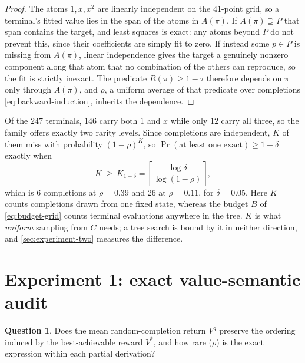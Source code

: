 \documentclass[11pt, a4paper]{article}
\theoremstyle{definition}
\newtheorem{question}[thm]{Question}
\newcommand{\noi}{\noindent}
\begin{document}
\begin{proof}
The atoms \(1,x,x^2\) are linearly independent on the \(41\)-point grid, so a
terminal's fitted value lies in the span of the atoms in \(A(\pi)\).  If
\(A(\pi)\supseteq P\) that span contains the target, and least squares is
exact: any atoms beyond \(P\) do not prevent this, since their coefficients
are simply fit to zero.  If instead some \(p\in P\) is missing from
\(A(\pi)\), linear independence gives the target a genuinely nonzero
component along that atom that no combination of the others can reproduce,
so the fit is strictly inexact.  The predicate \(R(\pi)\ge1-\tau\) therefore
depends on \(\pi\) only through \(A(\pi)\), and \(\rho\), a uniform average
of that predicate over completions \eqref{eq:backward-induction}, inherits
the dependence.
\end{proof}

\noi Of the \(247\) terminals, \(146\) carry both \(1\) and \(x\) while only
\(12\) carry all three, so the family offers exactly two rarity levels.
Since completions are
independent, \(K\) of them miss with
probability \((1-\rho)^K\), so \(\Pr(\text{at least one exact})\ge1-\delta\)
exactly when
\begin{equation}
    K\ \ge\ K_{1-\delta}
    =
    \left\lceil\frac{\log\delta}{\log(1-\rho)}\right\rceil,
    \label{eq:hit-budget}
\end{equation}
which is \(6\) completions at \(\rho=0.39\) and \(26\) at \(\rho=0.11\),
for \(\delta=0.05\).  Here \(K\) counts completions drawn from one fixed state,
whereas the budget \(B\) of \eqref{eq:budget-grid} counts terminal evaluations
anywhere in the tree.  \(K\) is what \emph{uniform} sampling from \(C\)
needs; a tree search is bound by it in neither direction, and
\cref{sec:experiment-two} measures the difference.

\section{Experiment 1: exact value-semantic audit}
\label{sec:experiment-one}

\begin{question}
Does the mean random-completion return \(V^q\) preserve the ordering induced
by the best-achievable reward \(V^*\), and how rare
(\(\rho\)) is the exact expression within each partial
derivation?
\end{question}
\end{document}
